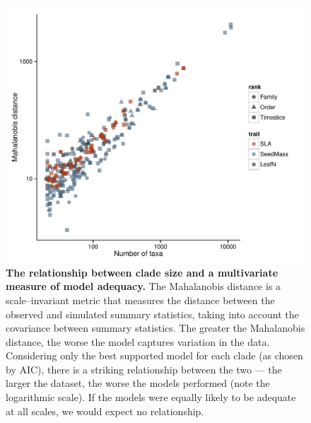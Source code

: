 \documentclass[a4paper,12pt]{article}
\begin{document}
\begin{figure}[p]
  \centering
  \includegraphics[scale=0.9]{figs/ad-size-ml}
  \caption{\textbf{The relationship between clade size and a multivariate measure of model adequacy.} The Mahalanobis distance is a scale--invariant metric that measures the distance between the observed and simulated summary statistics, taking into account the covariance between summary statistics. The greater the Mahalanobis distance, the worse the model captures variation in the data. Considering only the best supported model for each clade (as chosen by AIC), there is a striking relationship between the two --- the larger the dataset, the worse the models performed (note the logarithmic scale). If the models were equally likely to be adequate at all scales, we would expect no relationship.}
  \label{fig:size-adequacy}
\end{figure}

\renewcommand\thefigure{Box\arabic{figure}}
\renewcommand\thetable{Box \arabic{table}}
\setcounter{figure}{0}    
\setcounter{table}{0} 
\end{document}
